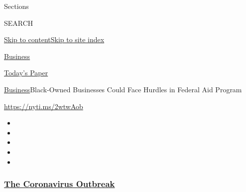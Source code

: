 Sections

SEARCH

\protect\hyperlink{site-content}{Skip to
content}\protect\hyperlink{site-index}{Skip to site index}

\href{https://www.nytimes3xbfgragh.onion/section/business}{Business}

\href{https://myaccount.nytimes3xbfgragh.onion/auth/login?response_type=cookie\&client_id=vi}{}

\href{https://www.nytimes3xbfgragh.onion/section/todayspaper}{Today's
Paper}

\href{/section/business}{Business}\textbar{}Black-Owned Businesses Could
Face Hurdles in Federal Aid Program

\url{https://nyti.ms/2wtwAob}

\begin{itemize}
\item
\item
\item
\item
\item
\end{itemize}

\hypertarget{the-coronavirus-outbreak}{%
\subsubsection{\texorpdfstring{\href{https://www.nytimes3xbfgragh.onion/news-event/coronavirus?name=styln-coronavirus-markets\&region=TOP_BANNER\&block=storyline_menu_recirc\&action=click\&pgtype=Article\&impression_id=49b204f0-f28f-11ea-87c3-11143d5ed90a\&variant=undefined}{The
Coronavirus
Outbreak}}{The Coronavirus Outbreak}}\label{the-coronavirus-outbreak}}

